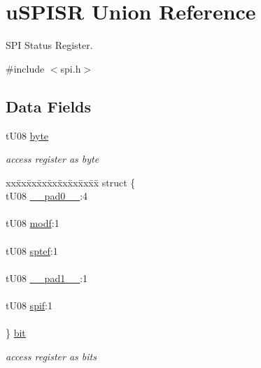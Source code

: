 \hypertarget{unionu_s_p_i_s_r}{}\section{u\+S\+P\+I\+S\+R Union Reference}
\label{unionu_s_p_i_s_r}


S\+P\+I Status Register.  




{\ttfamily \#include $<$spi.\+h$>$}

\subsection*{Data Fields}
\begin{DoxyCompactItemize}
\item 
\hypertarget{unionu_s_p_i_s_r_aba308d63db050aed25cfd36c37e41ad4}{}t\+U08 \hyperlink{unionu_s_p_i_s_r_aba308d63db050aed25cfd36c37e41ad4}{byte}\label{unionu_s_p_i_s_r_aba308d63db050aed25cfd36c37e41ad4}

\begin{DoxyCompactList}\small\item\em access register as byte \end{DoxyCompactList}\item 
\hypertarget{unionu_s_p_i_s_r_a86b0dffac0d9a5c86ec497f9697b88e3}{}\begin{tabbing}
xx\=xx\=xx\=xx\=xx\=xx\=xx\=xx\=xx\=\kill
struct \{\\
\>tU08 \hyperlink{unionu_s_p_i_s_r_aa3e5250d311ceb1525f9adf38f0d7982}{\_\_pad0\_\_}:4\\
\>\\
\>tU08 \hyperlink{unionu_s_p_i_s_r_a6f29551c49fccb912f326f353557399a}{modf}:1\\
\>\\
\>tU08 \hyperlink{unionu_s_p_i_s_r_a149644c0b80cde2ad74e6cc824a4b8d5}{sptef}:1\\
\>\\
\>tU08 \hyperlink{unionu_s_p_i_s_r_a79a5f05caf4105fead38063726e0f288}{\_\_pad1\_\_}:1\\
\>\\
\>tU08 \hyperlink{unionu_s_p_i_s_r_aa0380ae7d398596da0a28e37dd1742e8}{spif}:1\\
\>\\
\} \hyperlink{unionu_s_p_i_s_r_a86b0dffac0d9a5c86ec497f9697b88e3}{bit}\label{unionu_s_p_i_s_r_a86b0dffac0d9a5c86ec497f9697b88e3}
\\

\end{tabbing}\begin{DoxyCompactList}\small\item\em access register as bits \end{DoxyCompactList}\end{DoxyCompactItemize}


